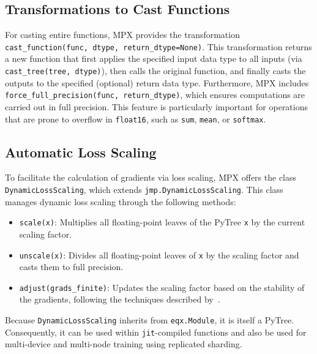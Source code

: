 \documentclass[copyright, logo]{dsme}
\newcommand{\mpx}{\textsc{MPX}}
\begin{document}
\subsection{Transformations to Cast Functions}
\label{sec:castingfunctions}

For casting entire functions, \mpx{} provides the transformation \texttt{cast\_function(func, dtype, return\_dtype=None)}. 
This transformation returns a new function that first applies the specified input data type to all inputs (via \texttt{cast\_tree(tree, dtype)}), then calls the original function, and finally casts the outputs to the specified (optional) return data type. 
Furthermore, \mpx{} includes \texttt{force\_full\_precision(func, return\_dtype)}, which ensures computations are carried out in full precision. 
This feature is particularly important for operations that are prone to overflow in \texttt{float16}, such as \texttt{sum}, \texttt{mean}, or \texttt{softmax}.


\subsection{Automatic Loss Scaling}
\label{sec:scaling}

To facilitate the calculation of gradients via loss scaling, \mpx{} offers the class \texttt{DynamicLossScaling}, which extends \texttt{jmp.DynamicLossScaling}. 
This class manages dynamic loss scaling through the following methods:

\begin{itemize}
    \item \texttt{scale(x)}: Multiplies all floating-point leaves of the PyTree \texttt{x} by the current scaling factor.
    \item \texttt{unscale(x)}: Divides all floating-point leaves of \texttt{x} by the scaling factor and casts them to full precision.
    \item \texttt{adjust(grads\_finite)}: Updates the scaling factor based on the stability of the gradients, following the techniques described by~\cite{mixed_precision_paper}.
\end{itemize}

Because \texttt{DynamicLossScaling} inherits from \texttt{eqx.Module}, it is itself a PyTree. 
Consequently, it can be used within \texttt{jit}-compiled functions and also be used for multi-device and multi-node training using replicated sharding.
\end{document}
